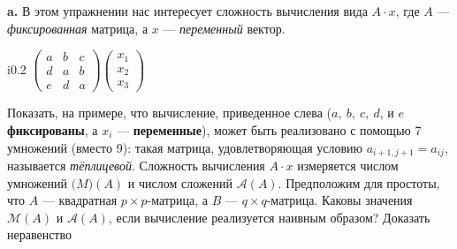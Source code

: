 \documentclass{mai_book}
\begin{document}
\medskip
\textbf{a.} В этом упражнении нас интересует сложность вычисления вида $A \cdot x$, где $A$ --- \textit{фиксированная} матрица, а $x$ --- \textit{переменный} вектор.
\begin{wrapfigure}{i}{0.2\textwidth}
  $
  \begin{pmatrix} a & b & c \\ d & a & b \\ e & d & a \end{pmatrix} \begin{pmatrix} x_1 \\ x_2 \\ x_3 \end{pmatrix}
  $
  \end{wrapfigure}
Показать, на примере, что вычисление, приведенное слева ($a,\ b,\ c,\ d$, и $e$ \textbf{фиксированы}, а $x_i$ --- \textbf{переменные}), может быть реализовано с помощью 7 умножений (вместо 9): такая матрица, удовлетворяющая условию $a_{i+1,j+1}=a_{ij}$, называется \textit{тёплицевой}. Сложность вычисления $A \cdot x$ измеряется числом умножений $\mathcal(M)(A)$ и числом сложений $\mathcal{A}(A)$. Предположим для простоты, что $A$ --- квадратная $p \times p$-матрица, а $B$ --- $q \times q$-матрица. Каковы значения $\mathcal{M}(A)$ и $\mathcal{A}(A)$, если вычисление реализуется наивным образом? Доказать неравенство
\end{document}
